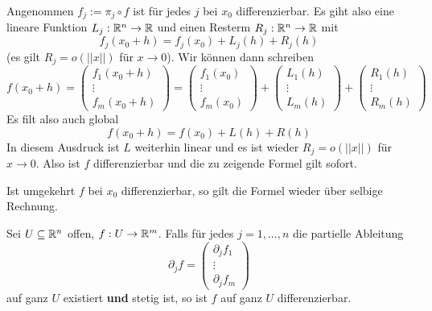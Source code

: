 \documentclass[main.tex]{subfiles}
\begin{document}
\begin{Beweis}
  Angenommen $f_j := \pi_j \circ f$ ist für jedes $j$ bei $x_0$ differenzierbar. Es giht also eine lineare Funktion $L_j : \mathbb{R}^n \to \mathbb{R}$ und einen Resterm $R_j: \mathbb{R}^n \to \mathbb{R}$ mit
  $$f_j(x_0 + h) = f_j(x_0) + L_j(h) + R_j(h)$$
  (es gilt $R_j = o(||x||)$ für $x \to 0$). Wir können dann schreiben
  $$f(x_0 + h) = \begin{pmatrix}
    f_1(x_0 + h) \\ \vdots \\ f_m(x_0 + h)
  \end{pmatrix} = \begin{pmatrix}
    f_1(x_0) \\ \vdots \\ f_m(x_0)
  \end{pmatrix} + \begin{pmatrix}
    L_1(h) \\ \vdots \\ L_m(h)
  \end{pmatrix} + \begin{pmatrix}
    R_1(h) \\ \vdots \\ R_m(h)
  \end{pmatrix}$$
  Es filt also auch global
  $$f(x_0 + h) = f(x_0) + L(h) + R(h)$$
  In diesem Ausdruck ist $L$ weiterhin linear und es ist wieder $R_j = o(||x||)$ für $x \to 0$. Also ist $f$ differenzierbar und die zu zeigende Formel gilt sofort.

  Ist umgekehrt $f$ bei $x_0$ differenzierbar, so gilt die Formel wieder über selbige Rechnung.
\end{Beweis}

\begin{Theorem}
  Sei $U \subseteq \mathbb{R}^n$ offen, $f: U \to \mathbb{R}^m$. Falls für jedes $j = 1, ..., n$ die partielle Ableitung
  $$\partial_j f = \left(\begin{array}{c} \partial_j f_1\\ \vdots \\ \partial_j f_m \end{array}\right)$$
  auf ganz $U$ existiert \textbf{und} stetig ist, so ist $f$ auf ganz $U$ differenzierbar.
\end{Theorem}
\end{document}

